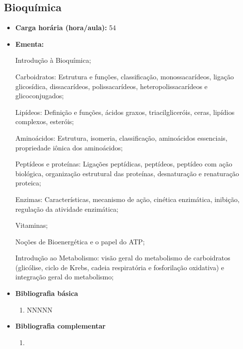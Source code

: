 \documentclass[11pt,fleqn]{book} %
\newcommand{\VER}[1]{\begingroup\color{red}#1\endgroup}
\begin{document}
\subsection{Bioquímica}\label{disc:bioquimica}
\begin{itemize}
	\item \textbf{Carga horária (hora/aula):} 54
	\item \textbf{Ementa:}
	
Introdução à Bioquímica;
 
Carboidratos: Estrutura e funções, classificação, monossacarídeos, ligação glicosídica, dissacarídeos, polissacarídeos, heteropolissacarídeos e glicoconjugados;
 
Lipídeos: Definição e funções, ácidos graxos, triacilgliceróis, ceras, lipídios complexos, esteróis;

Aminoácidos: Estrutura, isomeria, classificação, aminoácidos essenciais, propriedade iônica dos aminoácidos;

Peptídeos e proteínas: Ligações peptídicas, peptídeos, peptídeo com ação biológica, organização estrutural das proteínas, desnaturação e renaturação proteica;

Enzimas: Características, mecanismo de ação, cinética enzimática, inibição, regulação da atividade enzimática;

Vitaminas;

Noções de Bioenergética e o papel do ATP;

Introdução ao Metabolismo: visão geral do metabolismo de carboidratos (glicólise, ciclo de Krebs, cadeia respiratória e fosforilação oxidativa) e integração geral do metabolismo;
	
	
	
	
	\item \textbf{Bibliografia básica}
	\begin{enumerate}
		\item NNNNN
	\end{enumerate}
	\item \textbf{Bibliografia complementar}
	\begin{enumerate}
		\item 
	\end{enumerate}	
\end{itemize}



\newpage
\end{document}
